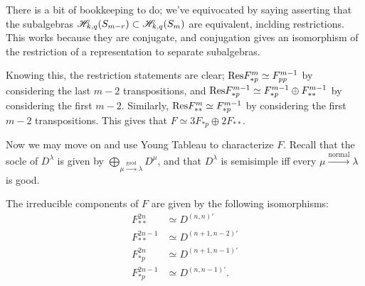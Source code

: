 \documentclass{amsart}
\begin{document}
There is a bit of bookkeeping to do;
we've equivocated by saying asserting that the subalgebras $\mathscr{H}_{k,q}(S_{m-r}) \subset \mathscr{H}_{k,q}(S_{m})$ are equivalent, inclding restrictions.
This works because they are conjugate, and conjugation gives an isomorphism of the restriction of a representation to separate subalgebras.

Knowing this, the restriction statements are clear;
$\text{Res} F_{*p}^m \simeq F_{pp}^{m-1}$ by considering the last $m-2$ transpositions, and $\text{Res} F_{*p}^{m-1} \simeq F_{*p}^{m-1} \oplus F_{**}^{m-1}$ by considering the first $m-2$.
Similarly, $\text{Res} F_{**}^m \simeq F_{*p}^{m-1}$ by considering the first $m-2$ transpositions.
This gives that $F \simeq 3F_{*p} \oplus 2F_{**}$.

Now we may move on and use Young Tableau to characterize $F$.
Recall that the socle of $D^\lambda$ is given by $\bigoplus\limits_{\mu \xrightarrow{\text{good}} \lambda} D^\mu$,  and that $D^\lambda$ is semisimple iff every $\mu \xrightarrow{\text{normal}} \lambda$ is good.
\begin{proposition}
  The irreducible components of $F$ are given by the following isomorphisms:
    \begin{align*}
      F^{2n}_{**} &\simeq D^{(n,n)'}\\ 
      F^{2n-1}_{**} &\simeq D^{(n+1,n-2)'}\\
      F^{2n}_{*p} &\simeq D^{(n+1,n-1)'}\\
      F^{2n-1}_{*p} &\simeq D^{(n,n-1)'}.
     \end{align*}
\end{proposition}
\end{document}
